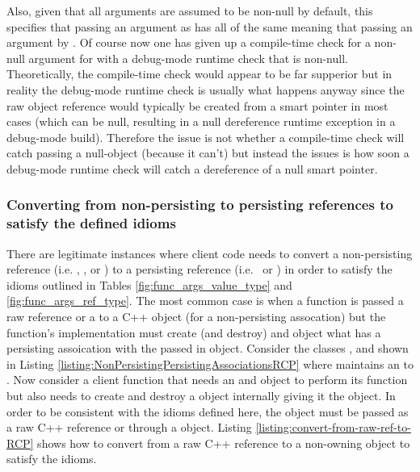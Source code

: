 \documentclass[pdf,ps2pdf,11pt]{SANDreport}
\begin{document}
Also, given that all {} arguments are assumed to be
non-null by default, this specifies that passing an argument as
{} has all of the same meaning that passing an
argument by {}.  Of course now one has given up a
compile-time check for a non-null argument for {} with a
debug-mode runtime check that {} is non-null.
Theoretically, the compile-time check would appear to be far supperior
but in reality the debug-mode runtime check is usually what happens
anyway since the raw object reference would typically be created from
a smart pointer in most cases (which can be null, resulting in a null
dereference runtime exception in a debug-mode build).  Therefore the
issue is not whether a compile-time check will catch passing a
null-object (because it can't) but instead the issues is how soon a
debug-mode runtime check will catch a dereference of a null smart
pointer.



%
{}\subsubsection*{Converting from non-persisting to persisting
references to satisfy the defined idioms}
%

There are legitimate instances where client code needs to convert a
non-persisting reference (i.e. {}, {}, or
{}) to a persisting reference (i.e.\ {} or
{}) in order to satisfy the idioms outlined in Tables
{}\ref{fig:func_args_value_type} and {}\ref{fig:func_args_ref_type}.
The most common case is when a function is passed a raw reference or a
{} to a C++ object (for a non-persisting assocation) but the
function's implementation must create (and destroy) and object what
has a persisting assoication with the passed in object.  Consider the
classes {}, {} and {} shown in Listing
{}\ref{listing:NonPersistingPersistingAssociationsRCP} where {}
maintains an {} to {}.  Now consider a client function
that needs an {} and {} object to perform its function
but also needs to create and destroy a {} object internally
giving it the {} object.  In order to be consistent with the
idioms defined here, the {} object must be passed as a raw C++
reference or through a {} object.  Listing
{}\ref{listing:convert-from-raw-ref-to-RCP} shows how to convert from
a raw C++ reference to a non-owning {} object to satisfy the
idioms.
\end{document}
